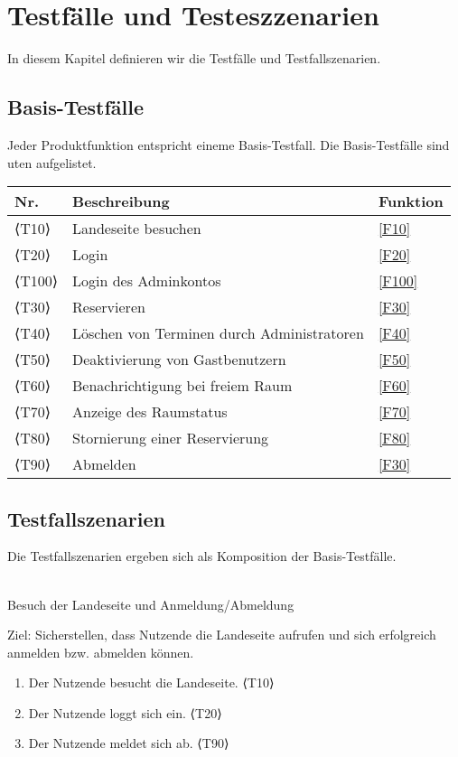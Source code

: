 \chapter{Testfälle und Testeszzenarien}
\label{chap:test}
In diesem Kapitel definieren wir die Testfälle und Testfallszenarien.

\section{Basis-Testfälle}

Jeder Produktfunktion entspricht eineme Basis-Testfall. Die Basis-Testfälle sind uten aufgelistet.


\begin{table}[htbp]


  \centering
  \begin{tabularx}{\textwidth}{ l|X|l }
      \textbf{Nr.} & \textbf{Beschreibung} & \textbf{Funktion} \\ \hline\hline
      ⟨T10⟩ & Landeseite besuchen &\ref{F10}\\
      ⟨T20⟩ & Login &\ref{F20} \\
      ⟨T100⟩& Login des Adminkontos &\ref{F100} \\
      ⟨T30⟩ & Reservieren &\ref{F30} \\
      ⟨T40⟩ & Löschen von Terminen durch Administratoren &\ref{F40} \\
      ⟨T50⟩ & Deaktivierung von Gastbenutzern &\ref{F50} \\
      ⟨T60⟩ & Benachrichtigung bei freiem Raum &\ref{F60} \\
      ⟨T70⟩ & Anzeige des Raumstatus &\ref{F70} \\
      ⟨T80⟩ & Stornierung einer Reservierung &\ref{F80} \\
      ⟨T90⟩ & Abmelden &\ref{F30} \\
  \end{tabularx}\label{tab:test_table}
\end{table}

\section{Testfallszenarien}
Die Testfallszenarien ergeben sich als Komposition der Basis-Testfälle.\\ \\
\begin{scenario}{10}{Besuch der Landeseite und Anmeldung/Abmeldung}
  \item[Ziel:] Sicherstellen, dass Nutzende die Landeseite aufrufen und sich erfolgreich anmelden bzw. abmelden können.
  \begin{enumerate}
    \item Der Nutzende besucht die Landeseite. ⟨T10⟩
    \item Der Nutzende loggt sich ein. ⟨T20⟩
    \item Der Nutzende meldet sich ab. ⟨T90⟩
  \end{enumerate}
\end{scenario}

